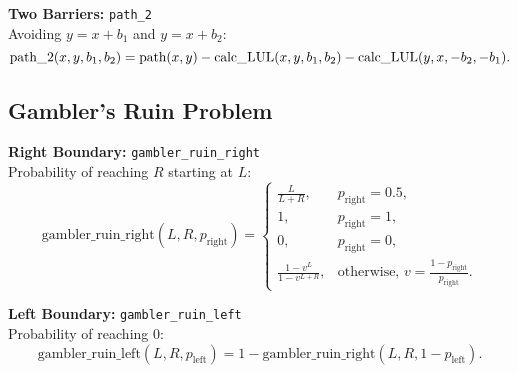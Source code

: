     \textbf{Two Barriers:} \texttt{path\_2} \\
    Avoiding $y=x+b_1$ and $y=x+b_2$:
    \[
    \text{path\_2}(x, y, b_1, b_2) = \text{path}(x, y) - \newline
    \text{calc\_LUL}(x, y, b_1, b_2) - \text{calc\_LUL}(y, x, -b_2, -b_1).
    \]

    \subsection{Gambler's Ruin Problem}
    \textbf{Right Boundary:} \texttt{gambler\_ruin\_right} \\
    Probability of reaching $R$ starting at $L$:
    \[
    \text{gambler\_ruin\_right}(L, R, p_{\text{right}}) =
    \begin{cases}
    \frac{L}{L+R}, & p_{\text{right}} = 0.5, \\
    1, & p_{\text{right}} = 1, \\
    0, & p_{\text{right}} = 0, \\
    \frac{1 - v^L}{1 - v^{L+R}}, & \text{otherwise, } v = \frac{1-p_{\text{right}}}{p_{\text{right}}}.
    \end{cases}
    \]

    \textbf{Left Boundary:} \texttt{gambler\_ruin\_left} \\
    Probability of reaching $0$:
    \[
    \text{gambler\_ruin\_left}(L, R, p_{\text{left}}) = 1 - \text{gambler\_ruin\_right}(L, R, 1-p_{\text{left}}).
    \]